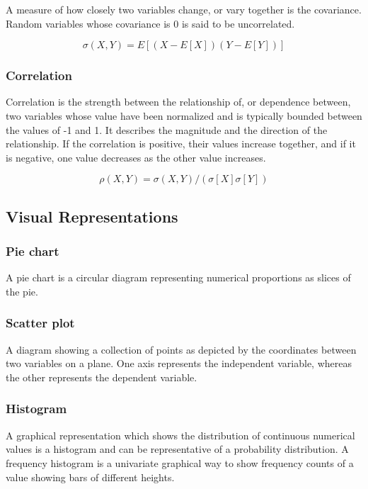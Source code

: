 \documentclass[11pt,]{article}
\begin{document}
A measure of how closely two variables change, or vary together is the
covariance. Random variables whose covariance is 0 is said to be
uncorrelated.

\[ \sigma(X, Y) = E[(X - E[X])(Y-E[Y])] \]

\subsubsection{Correlation}\label{correlation}

Correlation is the strength between the relationship of, or dependence
between, two variables whose value have been normalized and is typically
bounded between the values of -1 and 1. It describes the magnitude and
the direction of the relationship. If the correlation is positive, their
values increase together, and if it is negative, one value decreases as
the other value increases.

\[ \rho(X, Y) = \sigma(X, Y) / (\sigma [X] \sigma [Y]) \]

\subsection{Visual Representations}\label{visual-representations}

\subsubsection{Pie chart}\label{pie-chart}

A pie chart is a circular diagram representing numerical proportions as
slices of the pie.

\subsubsection{Scatter plot}\label{scatter-plot}

A diagram showing a collection of points as depicted by the coordinates
between two variables on a plane. One axis represents the independent
variable, whereas the other represents the dependent variable.

\subsubsection{Histogram}\label{histogram}

A graphical representation which shows the distribution of continuous
numerical values is a histogram and can be representative of a
probability distribution. A frequency histogram is a univariate
graphical way to show frequency counts of a value showing bars of
different heights.
\end{document}
